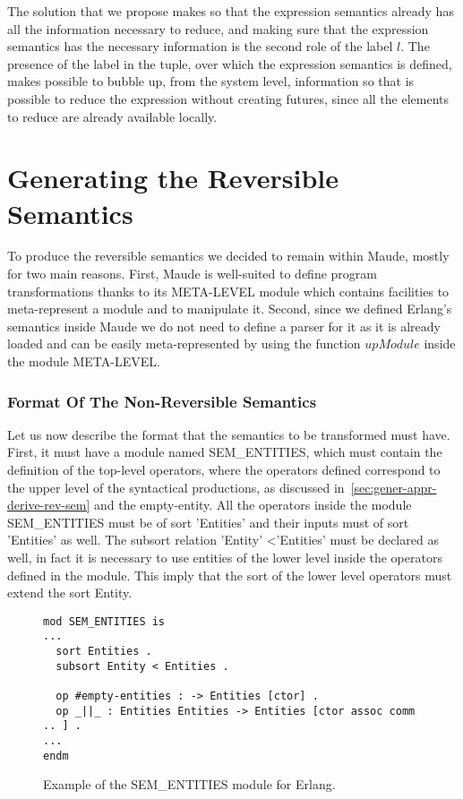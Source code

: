 \documentclass{article}[12pt,a4paper]
\theoremstyle{definition}
\begin{document}
The solution that we propose makes so that the expression semantics already has
all the information necessary to reduce, and making sure that the expression
semantics has the necessary information is the second role of the label $l$.
The presence of the label in the tuple, over which the expression semantics is
defined, makes possible to bubble up, from the system level, information so that is
possible to reduce the expression without creating futures, since all the
elements to reduce are already available locally. 



\section{Generating the Reversible Semantics}\label{sec:generating}

To produce the reversible semantics we decided to remain within Maude, mostly
for two main reasons. First, Maude is well-suited to define program transformations
thanks to its META-LEVEL module which contains facilities to meta-represent a
module and to manipulate it. Second, since we defined Erlang's semantics inside
Maude we do not need to define a parser for it as it is already loaded and can
be easily meta-represented by using the function $upModule$ inside the module
META-LEVEL.

\subsubsection{Format Of The Non-Reversible Semantics}
Let us now describe the format that the semantics to be transformed must have.
First, it must have a module named SEM_ENTITIES, which must contain the definition
of the top-level operators, where the operators defined correspond to the upper level
of the syntactical productions, as discussed
in~\ref{sec:gener-appr-derive-rev-sem} and the empty-entity.
All the operators inside the module SEM_ENTITIES must be of sort
'Entities' and their inputs must of sort 'Entities' as well. The subsort
relation 'Entity' \textless 'Entities' must be declared as well, in fact it is necessary
to use entities of the lower level inside the operators defined in the module.
This imply that the sort of the lower level operators must extend the sort
Entity.

\begin{figure}[t]
\begin{Verbatim}
mod SEM_ENTITIES is 
...
  sort Entities .
  subsort Entity < Entities .

  op #empty-entities : -> Entities [ctor] .
  op _||_ : Entities Entities -> Entities [ctor assoc comm .. ] .
...
endm
\end{Verbatim}
  \label{fig:sem-entities}
  \caption{Example of the SEM_ENTITIES module for Erlang.}
\end{figure}
\end{document}
